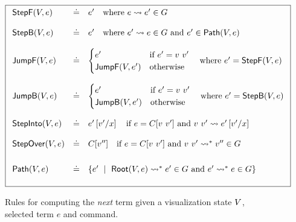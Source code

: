 \begin{figure*}[t]
\[
\boxed{
\begin{array}{lcl}
\stepforward{\vstate}{e}  & \defeq
  & e' \quad \mbox{where } \singlestep{e}{e'} \in \tr \\ \\

\stepbackward{\vstate}{e} & \defeq
  & e' \quad \mbox{where } \singlestep{e'}{e} \in \tr \mbox{ and } e' \in \vpath{\vstate}{e} \\ \\

\jumpforward{\vstate}{e} & \defeq
  & \begin{cases}
    e'                         & \mbox{if } e' = \eapp{v}{v'} \\
    \jumpforward{\vstate}{e'}  & \text{otherwise}
    \end{cases}
    \mbox{\quad where } e' = \stepforward{\vstate}{e} \\ \\

\jumpbackward{\vstate}{e} & \defeq
  & \begin{cases}
    e'                         & \mbox{if } e' = \eapp{v}{v'} \\
    \jumpbackward{\vstate}{e'} & \text{otherwise}
    \end{cases}
    \mbox{\quad where } e' = \stepbackward{\vstate}{e} \\ \\

\stepinto{\vstate}{e} & \defeq
  & e'\sub{x}{v'} \quad \mbox{if } e = C[\eapp{v}{v'}] \mbox{ and } \singlestep{\eapp{v}{v'}}{e'\sub{x}{v'}}  \\ \\

\stepover{\vstate}{e} & \defeq
  & C[v''] \quad \mbox{if } e = C[\eapp{v}{v'}] \mbox{ and } \multistep{\eapp{v}{v'}}{v''} \in \tr \\[0.25in]

\vpath{\vstate}{e} & \defeq
  & \{e' \spmid \multistep{\vroot{\vstate}{e}}{e'} \in \tr
                \mbox{ and }
                \multistep{e'}{e} \in \tr \} \\[0.15in]
\end{array}
}
\]
\caption{Rules for computing the \emph{next} term given a
         visualization state $\vstate$, selected term $e$
         and command.}
\label{fig:traversing-graph}
\end{figure*}
